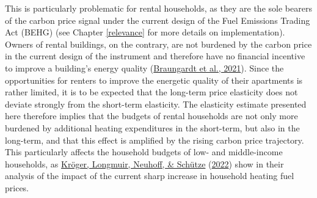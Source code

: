 \documentclass[12pt,twoside]{reedthesis}
\begin{document}
This is particularly problematic for rental households, as they are the sole bearers of the carbon price signal under the current design of the Fuel Emissions Trading Act (BEHG) (see Chapter \ref{relevance} for more details on implementation). Owners of rental buildings, on the contrary, are not burdened by the carbon price in the current design of the instrument and therefore have no financial incentive to improve a building's energy quality (\protect\hyperlink{ref-braungardt_etal21}{Braungardt et al., 2021}). Since the opportunities for renters to improve the energetic quality of their apartments is rather limited, it is to be expected that the long-term price elasticity does not deviate strongly from the short-term elasticity. The elasticity estimate presented here therefore implies that the budgets of rental households are not only more burdened by additional heating expenditures in the short-term, but also in the long-term, and that this effect is amplified by the rising carbon price trajectory. This particularly affects the household budgets of low- and middle-income households, as \protect\hyperlink{ref-kroger_etal22}{Kröger, Longmuir, Neuhoff, \& Schütze} (\protect\hyperlink{ref-kroger_etal22}{2022}) show in their analysis of the impact of the current sharp increase in household heating fuel prices.
\end{document}
